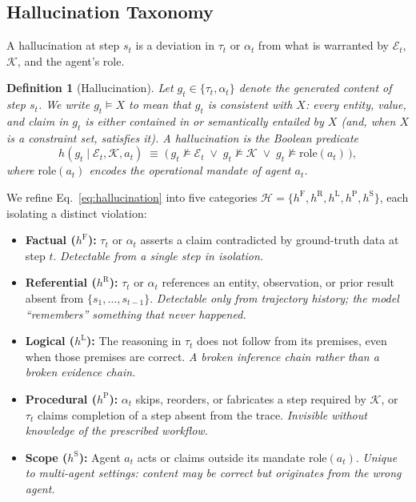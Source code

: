 \documentclass{article}
\newtheorem{definition}{Definition}
\begin{document}
\subsection{Hallucination Taxonomy}
\label{sec:taxonomy}

A hallucination at step $s_t$ is a deviation in $\tau_t$ or $\alpha_t$ from what is warranted by $\mathcal{E}_t$, $\mathcal{K}$, and the agent's role.

\begin{definition}[Hallucination]
\label{def:hallucination}
Let $g_t \in \{\tau_t, \alpha_t\}$ denote the generated content of step $s_t$. We write $g_t \models X$ to mean that $g_t$ is consistent with $X$: every entity, value, and claim in $g_t$ is either contained in or semantically entailed by $X$ (and, when $X$ is a constraint set, satisfies it). A \emph{hallucination} is the Boolean predicate
\begin{equation}
\label{eq:hallucination}
h(g_t \mid \mathcal{E}_t, \mathcal{K}, a_t) \;\equiv\; \big(\, g_t \not\models \mathcal{E}_t \;\vee\; g_t \not\models \mathcal{K} \;\vee\; g_t \not\models \mathrm{role}(a_t) \,\big),
\end{equation}
where $\mathrm{role}(a_t)$ encodes the operational mandate of agent $a_t$.
\end{definition}

We refine Eq.~\eqref{eq:hallucination} into five categories $\mathcal{H} = \{h^{\text{F}}, h^{\text{R}}, h^{\text{L}}, h^{\text{P}}, h^{\text{S}}\}$, each isolating a distinct violation:

\begin{itemize}
    \item \textbf{Factual ($h^{\text{F}}$):} $\tau_t$ or $\alpha_t$ asserts a claim contradicted by ground-truth data at step $t$. \emph{Detectable from a single step in isolation.}
    \item \textbf{Referential ($h^{\text{R}}$):} $\tau_t$ or $\alpha_t$ references an entity, observation, or prior result absent from $\{s_1, \dots, s_{t-1}\}$. \emph{Detectable only from trajectory history; the model ``remembers'' something that never happened.}
    \item \textbf{Logical ($h^{\text{L}}$):} The reasoning in $\tau_t$ does not follow from its premises, even when those premises are correct. \emph{A broken inference chain rather than a broken evidence chain.}
    \item \textbf{Procedural ($h^{\text{P}}$):} $\alpha_t$ skips, reorders, or fabricates a step required by $\mathcal{K}$, or $\tau_t$ claims completion of a step absent from the trace. \emph{Invisible without knowledge of the prescribed workflow.}
    \item \textbf{Scope ($h^{\text{S}}$):} Agent $a_t$ acts or claims outside its mandate $\mathrm{role}(a_t)$. \emph{Unique to multi-agent settings: content may be correct but originates from the wrong agent.}
\end{itemize}
\end{document}
